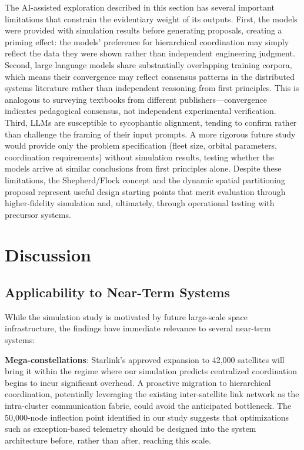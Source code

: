 \documentclass[journal]{IEEEtran}
\begin{document}
The AI-assisted exploration described in this section has several important limitations that constrain the evidentiary weight of its outputs. First, the models were provided with simulation results before generating proposals, creating a priming effect: the models' preference for hierarchical coordination may simply reflect the data they were shown rather than independent engineering judgment. Second, large language models share substantially overlapping training corpora, which means their convergence may reflect consensus patterns in the distributed systems literature rather than independent reasoning from first principles. This is analogous to surveying textbooks from different publishers---convergence indicates pedagogical consensus, not independent experimental verification. Third, LLMs are susceptible to sycophantic alignment, tending to confirm rather than challenge the framing of their input prompts. A more rigorous future study would provide only the problem specification (fleet size, orbital parameters, coordination requirements) without simulation results, testing whether the models arrive at similar conclusions from first principles alone. Despite these limitations, the Shepherd/Flock concept and the dynamic spatial partitioning proposal represent useful design starting points that merit evaluation through higher-fidelity simulation and, ultimately, through operational testing with precursor systems.


\section{Discussion}

\subsection{Applicability to Near-Term Systems}

While the simulation study is motivated by future large-scale space infrastructure, the findings have immediate relevance to several near-term systems:

\textbf{Mega-constellations}: Starlink's approved expansion to 42{,}000 satellites will bring it within the regime where our simulation predicts centralized coordination begins to incur significant overhead. A proactive migration to hierarchical coordination, potentially leveraging the existing inter-satellite link network as the intra-cluster communication fabric, could avoid the anticipated bottleneck. The 50{,}000-node inflection point identified in our study suggests that optimizations such as exception-based telemetry should be designed into the system architecture before, rather than after, reaching this scale.
\end{document}
